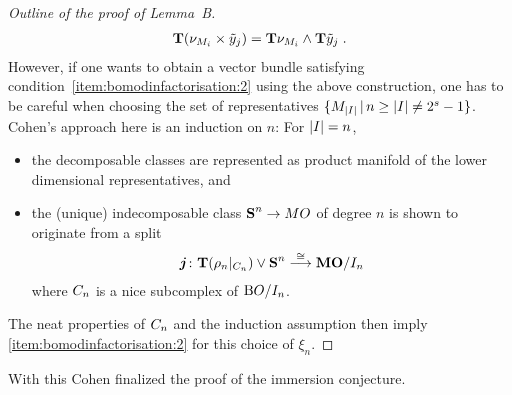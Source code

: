 \begin{proof}[Outline of the proof of Lemma~B]
\begin{gather*}
    \bm{\mathrm{T}}{(\nu_{M_i} \times \tilde y_j)}
    = \bm{\mathrm{T}}{\nu_{M_i}} \wedge \bm{\mathrm{T}}{\tilde y_j}
    \;.
  \end{gather*}
  However, if one wants to obtain a vector bundle satisfying
  condition~\ref{item:bomodinfactorisation:2} using the above
  construction, one has to be careful when choosing the
  set of representatives $\{M_{\left|I\right|}\,|\, n\geq\left|I\right|\neq 2^s-1\}$.
  Cohen's approach here is an induction on $n$:
  For $\left|I\right|=n$,
  \begin{itemize}
  \item the decomposable classes are represented as product
    manifold of the lower dimensional representatives, and
  \item the (unique) indecomposable class $\bm{\mathrm{S}}^{n}\to MO$ of degree
    $n$ is shown to originate from a split
    \begin{gather*}
      \bm{j}\colon
      \bm{\mathrm{T}}{(\rho_n|_{C_{n}})} \vee \bm{\mathrm{S}}^{n}
      \overset{\cong}\longrightarrow \bm{\mathrm{MO}}/I_{n}
    \end{gather*}
    where $C_{n}$ is a nice subcomplex of $\mathrm{B}O/I_{n}$.
  \end{itemize}
  The neat properties of $C_{n}$ and the induction assumption
  then imply \ref{item:bomodinfactorisation:2} for this choice of
  $\xi_n$.
\end{proof}

With this Cohen finalized the proof of the immersion conjecture.



